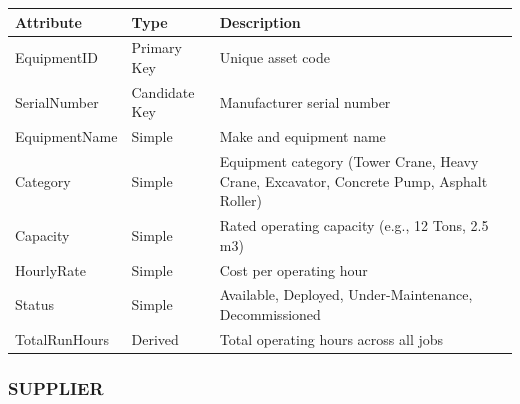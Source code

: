 \documentclass[a4paper,12pt]{report}
\newcounter{none} %
\begin{document}
{\def\LTcaptype{none} %
\begin{longtable}[]{@{}
  >{\raggedright\arraybackslash}p{}
  >{\raggedright\arraybackslash}p{}
  >{\raggedright\arraybackslash}p{}@{}}
\toprule\noalign{}
\begin{minipage}[b]{\linewidth}\raggedright
Attribute
\end{minipage} & \begin{minipage}[b]{\linewidth}\raggedright
Type
\end{minipage} & \begin{minipage}[b]{\linewidth}\raggedright
Description
\end{minipage} \\
\midrule\noalign{}
\endhead
\bottomrule\noalign{}
\endlastfoot
EquipmentID & Primary Key & Unique asset code \\
SerialNumber & Candidate Key & Manufacturer serial number \\
EquipmentName & Simple & Make and equipment name \\
Category & Simple & Equipment category (\allowbreak{}Tower Crane, Heavy Crane, Excavator, Concrete Pump, Asphalt Roller) \\
Capacity & Simple & Rated operating capacity (\allowbreak{}e.\allowbreak{}g., 12 Tons, 2.5 m3) \\
HourlyRate & Simple & Cost per operating hour \\
Status & Simple & Available, Deployed, Under-Maintenance, Decommissioned \\
TotalRunHours & Derived & Total operating hours across all jobs \\
\end{longtable}
}

\subsubsection{SUPPLIER}\label{supplier}
\end{document}
